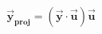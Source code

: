 \documentclass[preview]{standalone}
\begin{document}
\begin{align*}
\mathbf{\vec{y}}_{\textbf{proj}} = (\mathbf{\vec{y}} \cdot \mathbf{\vec{u}}) \mathbf{\vec{u}}
\end{align*}
\end{document}
